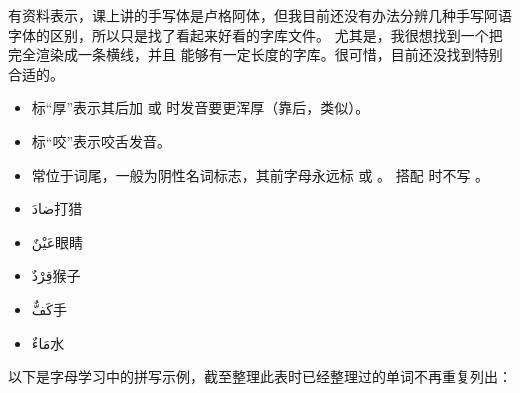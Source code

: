 \begin{note}
    有资料表示，课上讲的手写体是卢格阿体，但我目前还没有办法分辨几种手写阿语字体的区别，所以只是找了看起来好看的字库文件。
    尤其是，我很想找到一个把 完全渲染成一条横线，并且 能够有一定长度的字库。很可惜，目前还没找到特别合适的。
\end{note}

\begin{itemize}
    \item 标``厚''表示其后加  或  时发音要更浑厚（靠后，类似\textipa{[A]}）。
    \item 标``咬''表示咬舌发音。
    \item {} 常位于词尾，一般为阴性名词标志，其前字母永远标  或  。 搭配  时不写 。
    \item \ac{ضادَ}{打猎}
    \item \ac{عَيْنٌ}{眼睛} 
    \item \ac{قِرْدٌ}{猴子}
    \item \ac{كَفٌّ}{手}
    \item \ac{مَاءٌ}{水}
\end{itemize}

以下是字母学习中的拼写示例，截至整理此表时已经整理过的单词不再重复列出：


